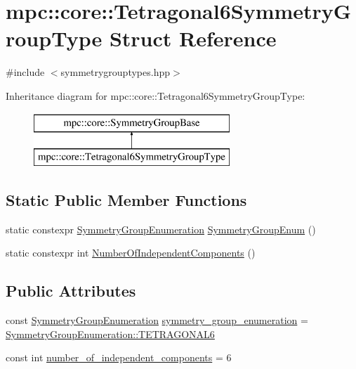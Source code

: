 \hypertarget{structmpc_1_1core_1_1_tetragonal6_symmetry_group_type}{}\section{mpc\+:\+:core\+:\+:Tetragonal6\+Symmetry\+Group\+Type Struct Reference}
\label{structmpc_1_1core_1_1_tetragonal6_symmetry_group_type}


{\ttfamily \#include $<$symmetrygrouptypes.\+hpp$>$}

Inheritance diagram for mpc\+:\+:core\+:\+:Tetragonal6\+Symmetry\+Group\+Type\+:\begin{figure}[H]
\begin{center}
\leavevmode
\includegraphics[height=2.000000cm]{structmpc_1_1core_1_1_tetragonal6_symmetry_group_type}
\end{center}
\end{figure}
\subsection*{Static Public Member Functions}
\begin{DoxyCompactItemize}
\item 
static constexpr \mbox{\hyperlink{namespacempc_1_1core_a9d979684062547055a0ef5c13077bad8}{Symmetry\+Group\+Enumeration}} \mbox{\hyperlink{structmpc_1_1core_1_1_tetragonal6_symmetry_group_type_a12c314c829a64caa780042971b408276}{Symmetry\+Group\+Enum}} ()
\item 
static constexpr int \mbox{\hyperlink{structmpc_1_1core_1_1_tetragonal6_symmetry_group_type_a850fa21a343d070374b5721c67b0fbf7}{Number\+Of\+Independent\+Components}} ()
\end{DoxyCompactItemize}
\subsection*{Public Attributes}
\begin{DoxyCompactItemize}
\item 
const \mbox{\hyperlink{namespacempc_1_1core_a9d979684062547055a0ef5c13077bad8}{Symmetry\+Group\+Enumeration}} \mbox{\hyperlink{structmpc_1_1core_1_1_tetragonal6_symmetry_group_type_a0fc41c7a0983b71f5cb7c1d9363afd60}{symmetry\+\_\+group\+\_\+enumeration}} = \mbox{\hyperlink{namespacempc_1_1core_a9d979684062547055a0ef5c13077bad8a63dabd41a700b44f934a19db4e0f8f83}{Symmetry\+Group\+Enumeration\+::\+T\+E\+T\+R\+A\+G\+O\+N\+A\+L6}}
\item 
const int \mbox{\hyperlink{structmpc_1_1core_1_1_tetragonal6_symmetry_group_type_a9eff4d9cae5ae207ac078a35fa9da8b1}{number\+\_\+of\+\_\+independent\+\_\+components}} = 6
\end{DoxyCompactItemize}


